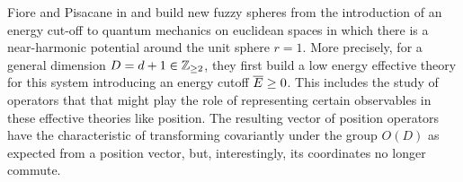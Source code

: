 {%
            
                
            
                
            
    
    
    
        
        
            
    
}

Fiore and Pisacane in \cite{Fiore2018} and \cite{Fiore2019} build new fuzzy spheres from the introduction of an energy cut-off to quantum mechanics on euclidean spaces in which there is a near-harmonic potential around the unit sphere $r = 1$. More precisely, for a general dimension $D = d+1 \in \mathbb{Z}_{\geq 2}$, they first build a low energy effective theory for this system introducing an energy cutoff $\overline{E} \geq 0$. This includes the study of operators that that might play the role of representing certain observables in these effective theories like position. The resulting vector of position operators have the characteristic of transforming covariantly under the group $O(D)$ as expected from a position vector, but, interestingly, its coordinates no longer commute.

